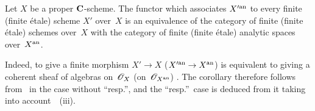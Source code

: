 \begin{corollary}
\label{XII.4.6}
Let $X$ be a proper $\mathbf{C}$-scheme. The functor which associates $X'^{\mathrm{an}}$ to every
finite (\resp finite étale) scheme $X'$ over~$X$
is an equivalence of the category of finite
(\resp finite étale) schemes over~$X$ with the category
of finite (\resp finite étale) analytic spaces over~$X^{\mathrm{an}}$.
\end{corollary}

Indeed, to give a finite morphism $X'\to X$ (\resp $X'^{\an}\to
X^{\an}$) is equivalent to giving a coherent sheaf
of algebras on~$\cal{O}_X$ (\resp on~$\cal{O}_{X^{\an}}$)
\cite[~\S 5~th]{XII.4}. The corollary therefore follows from~
in the case without ``resp.'', and the ``resp.''\ case is deduced from it taking
into account~~(iii).
